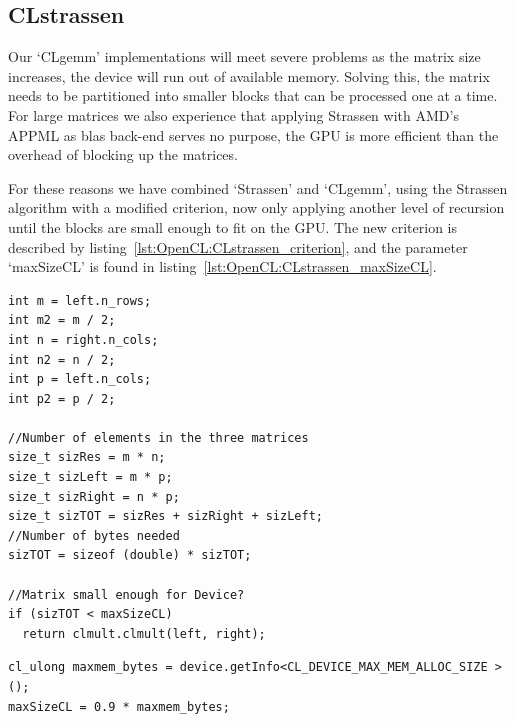 \subsection{CLstrassen}
Our `CLgemm' implementations will meet severe problems as the matrix size increases, the device will run out of available memory. 
Solving this, the matrix needs to be partitioned into smaller blocks that can be processed one at a time.
For large matrices we also experience that applying Strassen with AMD's APPML as blas back-end serves no purpose, the GPU is more efficient than the overhead of blocking up the matrices.

For these reasons we have combined `Strassen' and `CLgemm', using the Strassen algorithm with a modified criterion, now only applying another level of recursion until the blocks are small enough to fit on the GPU.
The new criterion is described by listing~\ref{lst:OpenCL:CLstrassen_criterion}, and the parameter `maxSizeCL' is found in listing~\ref{lst:OpenCL:CLstrassen_maxSizeCL}.
\begin{lstlisting}[float,label={lst:OpenCL:CLstrassen_criterion},caption={CLstrassen's new criterion.}]
int m = left.n_rows;
int m2 = m / 2;
int n = right.n_cols;
int n2 = n / 2;
int p = left.n_cols;
int p2 = p / 2;

//Number of elements in the three matrices
size_t sizRes = m * n;
size_t sizLeft = m * p;
size_t sizRight = n * p;
size_t sizTOT = sizRes + sizRight + sizLeft;
//Number of bytes needed
sizTOT = sizeof (double) * sizTOT;

//Matrix small enough for Device?
if (sizTOT < maxSizeCL)
  return clmult.clmult(left, right); 
\end{lstlisting}
\begin{lstlisting}[float,label={lst:OpenCL:CLstrassen_maxSizeCL},caption={How to query the max number of bytes on a GPU device available for OpenCL.}]
cl_ulong maxmem_bytes = device.getInfo<CL_DEVICE_MAX_MEM_ALLOC_SIZE > ();
maxSizeCL = 0.9 * maxmem_bytes;
\end{lstlisting}













